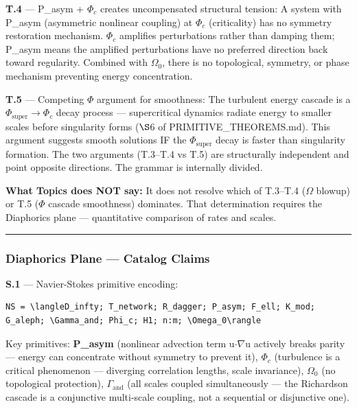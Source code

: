 \documentclass[11pt,a4paper]{article}
\begin{document}
\textbf{T.4} --- P\_asym + $\Phi_c$ creates uncompensated structural tension: A system with P\_asym (asymmetric nonlinear coupling) at $\Phi_c$ (criticality) has no symmetry restoration mechanism. $\Phi_c$ amplifies perturbations rather than damping them; P\_asym means the amplified perturbations have no preferred direction back toward regularity. Combined with $\Omega_0$, there is no topological, symmetry, or phase mechanism preventing energy concentration.

\textbf{T.5} --- Competing $\Phi$ argument for smoothness: The turbulent energy cascade is a $\Phi_\text{super} \to \Phi_c$ decay process --- supercritical dynamics radiate energy to smaller scales before singularity forms ($\S$6 of PRIMITIVE\_THEOREMS.md). This argument suggests smooth solutions IF the $\Phi_\text{super}$ decay is faster than singularity formation. The two arguments (T.3--T.4 vs T.5) are structurally independent and point opposite directions. The grammar is internally divided.

\textbf{What Topics does NOT say:} It does not resolve which of T.3--T.4 ($\Omega$ blowup) or T.5 ($\Phi$ cascade smoothness) dominates. That determination requires the Diaphorics plane --- quantitative comparison of rates and scales.

\begin{center}
\rule{0.5\textwidth}{0.4pt}
\end{center}

\subsubsection{Diaphorics Plane --- Catalog Claims}

\textbf{S.1} --- Navier-Stokes primitive encoding:

\begin{lstlisting}
NS = \langleD_infty; T_network; R_dagger; P_asym; F_ell; K_mod; G_aleph; \Gamma_and; Phi_c; H1; n:m; \Omega_0\rangle
\end{lstlisting}

Key primitives: \textbf{P\_asym} (nonlinear advection term u$\cdot$$\nabla$u actively breaks parity --- energy can concentrate without symmetry to prevent it), \textbf{$\Phi_c$} (turbulence is a critical phenomenon --- diverging correlation lengths, scale invariance), \textbf{$\Omega_0$} (no topological protection), \textbf{$\Gamma_\text{and}$} (all scales coupled simultaneously --- the Richardson cascade is a conjunctive multi-scale coupling, not a sequential or disjunctive one).
\end{document}
